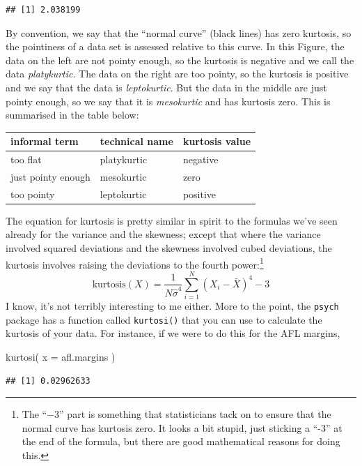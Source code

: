 \documentclass[
]{book}
\newenvironment{Shaded}{\begin{snugshade}}{\end{snugshade}}
\newcommand{\AttributeTok}[1]{\textcolor[rgb]{0.77,0.63,0.00}{#1}}
\newcommand{\FunctionTok}[1]{\textcolor[rgb]{0.00,0.00,0.00}{#1}}
\newcommand{\NormalTok}[1]{#1}
\begin{document}
\begin{verbatim}
## [1] 2.038199
\end{verbatim}

By convention, we say that the ``normal curve'' (black lines) has zero kurtosis, so the pointiness of a data set is assessed relative to this curve. In this Figure, the data on the left are not pointy enough, so the kurtosis is negative and we call the data \emph{platykurtic}. The data on the right are too pointy, so the kurtosis is positive and we say that the data is \emph{leptokurtic}. But the data in the middle are just pointy enough, so we say that it is \emph{mesokurtic} and has kurtosis zero. This is summarised in the table below:

\begin{tabular}{lll}
\toprule
informal term & technical name & kurtosis value\\
\midrule
too flat & platykurtic & negative\\
just pointy enough & mesokurtic & zero\\
too pointy & leptokurtic & positive\\
\bottomrule
\end{tabular}

The equation for kurtosis is pretty similar in spirit to the formulas we've seen already for the variance and the skewness; except that where the variance involved squared deviations and the skewness involved cubed deviations, the kurtosis involves raising the deviations to the fourth power:\footnote{The ``\(-3\)'' part is something that statisticians tack on to ensure that the normal curve has kurtosis zero. It looks a bit stupid, just sticking a ``-3'' at the end of the formula, but there are good mathematical reasons for doing this.}
\[
\mbox{kurtosis}(X) = \frac{1}{N \hat\sigma^4} \sum_{i=1}^N \left( X_i - \bar{X} \right)^4  - 3
\]
I know, it's not terribly interesting to me either. More to the point, the \texttt{psych} package has a function called \texttt{kurtosi()} that you can use to calculate the kurtosis of your data. For instance, if we were to do this for the AFL margins,

\begin{Shaded}
\begin{Highlighting}[]
\FunctionTok{kurtosi}\NormalTok{( }\AttributeTok{x =}\NormalTok{ afl.margins )}
\end{Highlighting}
\end{Shaded}

\begin{verbatim}
## [1] 0.02962633
\end{verbatim}
\end{document}
